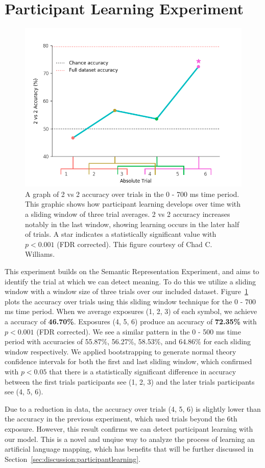 \section{Participant Learning Experiment}
\label{sec:results:participantlearning}

\begin{figure}[t]
  \centering
  \includegraphics[width=0.75\linewidth]{figures/learning}
  \caption[\tvt Accuracy over Trials]{
    A graph of 2 vs 2 accuracy over trials in the 0 - 700 ms time period. This 
    graphic shows how participant learning develops over time with a sliding 
    window of three trial averages.  2 vs 2 accuracy increases notably in the 
    last window, showing learning occurs in the later half of trials. A star 
    indicates a statistically significant value with $p < 0.001$ (FDR 
    corrected). This figure courtesy of Chad C. Williams.
  }
  \label{fig:learning}
\end{figure}

This experiment builds on the Semantic Representation Experiment, and aims to 
identify the trial at which we can detect meaning. To do this we utilize a 
sliding window with a window size of three trials over our included dataset.   
Figure~\ref{fig:learning} plots the \tvt accuracy over trials using this 
sliding window technique for the 0 - 700 ms time period. When we average 
exposures (1, 2, 3) of each symbol, we achieve a \tvt accuracy of 
\textbf{46.70\%}.  Exposures (4, 5, 6) produce an accuracy of \textbf{72.35\%} 
with $p < 0.001$ (FDR corrected). We see a similar pattern in the 0 - 500 ms 
time period with accuracies of 55.87\%, 56.27\%, 58.53\%, and 64.86\% for each 
sliding window respectively. We applied bootstrapping to generate normal theory 
confidence intervals for both the first and last sliding window, which 
confirmed with $p < 0.05$ that there is a statistically significant difference 
in \tvt accuracy between the first trials participants see (1, 2, 3) and the 
later trials participants see (4, 5, 6).

Due to a reduction in data, the \tvt accuracy over trials (4, 5, 6) is slightly 
lower than the \tvt accuracy in the previous experiment, which used trials 
beyond the 6th exposure. However, this result confirms we can detect 
participant learning with our model. This is a novel and unqiue way to analyze 
the process of learning an artificial language mapping, which has benefits that 
will be further discussed in Section~\ref{sec:discussion:participantlearning}.

